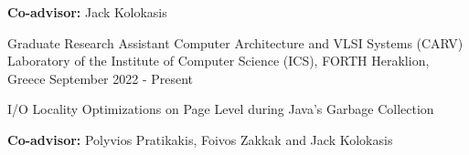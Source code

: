 \begin{cventries}
{\begin{cvitems}
        \item{\textbf{Co-advisor:} Jack Kolokasis}
      \end{cvitems}
    }
  \cventry
    {Graduate Research Assistant} %
    {Computer Architecture and VLSI Systems (CARV) Laboratory of the Institute of Computer Science (ICS), FORTH} %
    {Heraklion, Greece} %
    {September 2022 - Present} %
    {
      \begin{cvitems} %
        \item {I/O Locality Optimizations on Page Level during Java's Garbage Collection}
        \item{\textbf{Co-advisor:} Polyvios Pratikakis, Foivos Zakkak and Jack Kolokasis}
      \end{cvitems}
    }
\end{cventries}
